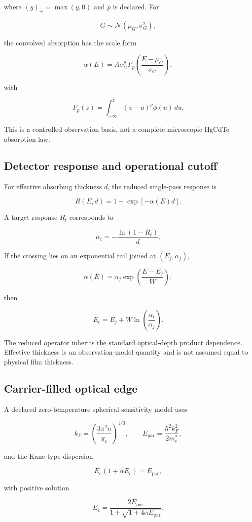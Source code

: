 \documentclass[12pt]{article}
\begin{document}
where $(y)_+=\max(y,0)$ and $p$ is declared. For

\[
G\sim\mathcal N(\mu_G,\sigma_G^2),
\]

the convolved absorption has the scale form

\[
\bar\alpha(E)
=A\sigma_G^p
F_p\left(\frac{E-\mu_G}{\sigma_G}\right),
\]

with

\[
F_p(z)=\int_{-\infty}^{z}(z-u)^p\phi(u)\,du.
\]

This is a controlled observation basis, not a complete microscopic HgCdTe absorption law.

\subsection{Detector response and operational cutoff}

For effective absorbing thickness $d$, the reduced single-pass response is

\[
R(E,d)=1-\exp[-\alpha(E)d].
\]

A target response $R_t$ corresponds to

\[
\alpha_t=-\frac{\ln(1-R_t)}{d}.
\]

If the crossing lies on an exponential tail joined at $(E_j,\alpha_j)$,

\[
\alpha(E)=\alpha_j\exp\left(\frac{E-E_j}{W}\right),
\]

then

\[
E_c=E_j+W\ln\left(\frac{\alpha_t}{\alpha_j}\right).
\]

The reduced operator inherits the standard optical-depth product dependence. \cite{iupac_beer_lambert_2025} Effective thickness is an observation-model quantity and is not assumed equal to physical film thickness.

\subsection{Carrier-filled optical edge}

A declared zero-temperature spherical sensitivity model uses

\[
k_F=\left(\frac{3\pi^2n}{g_v}\right)^{1/3},
\qquad
E_{\mathrm{par}}=\frac{\hbar^2k_F^2}{2m_e^*},
\]

and the Kane-type dispersion

\[
E_c(1+\alpha E_c)=E_{\mathrm{par}},
\]

with positive solution

\[
E_c=
\frac{2E_{\mathrm{par}}}
{1+\sqrt{1+4\alpha E_{\mathrm{par}}}}.
\]
\end{document}
